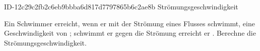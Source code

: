 \begin{exercise}
      {ID-12c29c2fb2c6eb9bbba6d817d7797865b6c2ae8b}
      {Strömungsgeschwindigkeit}
  \ifproblem\problem\par
    Ein Schwimmer erreicht, wenn er mit der Strömung eines Flusses schwimmt,
    eine Geschwindigkeit von ; schwimmt er gegen die Strömung erreicht
    er . Berechne die Strömungsgeschwindigkeit.
  \fi
\end{exercise}
